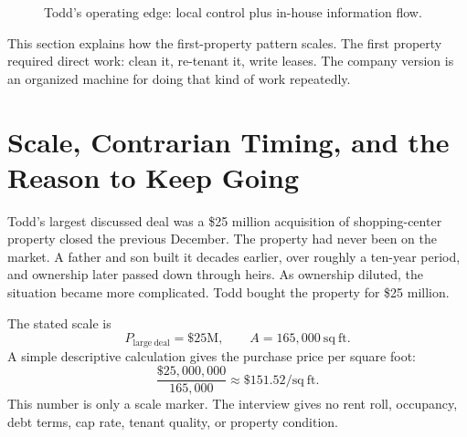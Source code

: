 \begin{figure}
\centering
{}
\caption{Todd's operating edge: local control plus in-house information flow.}
\end{figure}

This section explains how the first-property pattern scales. The first property required direct work: clean it, re-tenant it, write leases. The company version is an organized machine for doing that kind of work repeatedly.

\section{Scale, Contrarian Timing, and the Reason to Keep Going}

Todd's largest discussed deal was a \$25 million acquisition of shopping-center property closed the previous December. The property had never been on the market. A father and son built it decades earlier, over roughly a ten-year period, and ownership later passed down through heirs. As ownership diluted, the situation became more complicated. Todd bought the property for \$25 million.

The stated scale is
\begin{equation}
P_{\mathrm{large\ deal}}=\$25\mathrm{M},
\qquad
A=165{,}000\ \mathrm{sq\ ft}.
\end{equation}
A simple descriptive calculation gives the purchase price per square foot:
\begin{equation}
\frac{\$25{,}000{,}000}{165{,}000}
\approx
\$151.52/\mathrm{sq\ ft}.
\end{equation}
This number is only a scale marker. The interview gives no rent roll, occupancy, debt terms, cap rate, tenant quality, or property condition.

